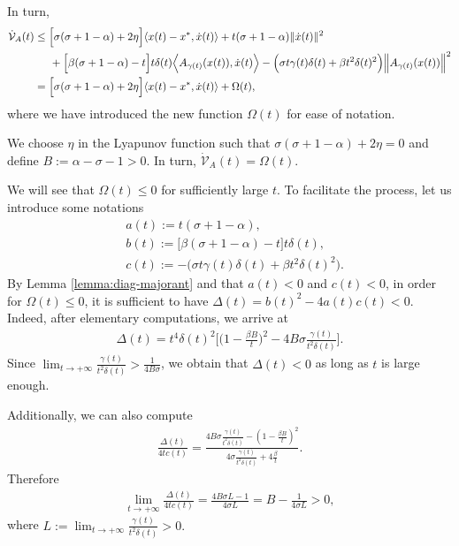 \documentclass[11pt]{article}
\numberwithin{equation}{section}
\begin{document}
In turn, 
\begin{align*}
    \dot{\mathcal{V}}_{A}(t) &\le \Big[\sigma(\sigma+1-\alpha)+2\eta\Big]\langle x(t)-x^*,\dot{x}(t) \rangle +t(\sigma+1-\alpha)\Vert \dot{x}(t) \Vert^2 \\
    &\hspace{5mm}+\Big[\beta(\sigma+1-\alpha)-t\Big]t\delta(t)\Big\langle A_{\gamma(t)}(x(t)),\dot{x}(t) \Big\rangle  -\Big({\sigma t\gamma(t)\delta(t)}+{\beta t^2\delta(t)^2}\Big)\Big\Vert A_{\gamma(t)}(x(t)) \Big \Vert^2 \\
    &= \Big[\sigma(\sigma+1-\alpha)+2\eta\Big]\langle x(t)-x^*,\dot{x}(t) \rangle + \Omega(t),
\end{align*}
where we have introduced the new function $\Omega(t)$ for ease of notation. 

We choose $\eta$ in the Lyapunov function such that $\sigma(\sigma+1-\alpha)+2\eta=0$ and define $B:=\alpha-\sigma-1>0$. In turn, $\dot{\mathcal{V}}_{A}(t) = \Omega(t)$. 

We will see that $\Omega(t) \le 0$ for sufficiently large $t$. To facilitate the process, let us introduce some notations
\begin{align*}
    &a(t):=t(\sigma+1-\alpha),\\
    &b(t):=\Big[\beta(\sigma+1-\alpha)-t\Big]t\delta(t),\\
    &c(t):=-\Big({\sigma t\gamma(t)\delta(t)}+{\beta t^2\delta(t)^2}\Big). 
\end{align*}
By Lemma \ref{lemma:diag-majorant} and that $a(t)<0$ and $c(t)<0$, in order for $\Omega(t) \le 0$, it is sufficient to have $\Delta(t)=b(t)^2-4a(t)c(t) < 0$. Indeed, after elementary computations, we arrive at
\begin{align*}
    \Delta(t)={t^4\delta(t)^2}\Big[\Big(1-\frac{\beta B}{t}\Big)^2-4B\sigma \frac{\gamma(t)}{t^2\delta(t)}\Big].
\end{align*}
Since $\lim_{t\to +\infty}\frac{\gamma(t)}{t^2\delta(t)}>\frac{1}{4B\sigma}$, we obtain that $\Delta(t) < 0$ as long as $t$ is large enough. 

Additionally, we can also compute 
\begin{align*}
    \frac{\Delta(t)}{4tc(t)}=\frac{4B\sigma\frac{\gamma(t)}{t^2\delta(t)}-(1-\frac{\beta B}{t})^2}{4\sigma\frac{\gamma(t)}{t^2\delta(t)}+4\frac{\beta}{t}}.
\end{align*}
Therefore 
\begin{align*}
\lim_{t \to +\infty} \frac{\Delta(t)}{4tc(t)} =\frac{4B\sigma L-1}{4\sigma L}=B-\frac{1}{4\sigma L}>0,  
\end{align*}
where $L:=\lim_{t\to +\infty}\frac{\gamma(t)}{t^2\delta(t)} >0.$ 
\end{document}
